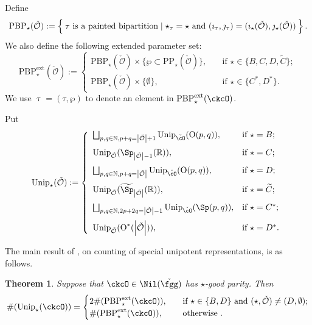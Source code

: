 \documentclass[12pt,a4paper]{amsart}
\def\abs#1{\left|{#1}\right|}
\newcommand{\BN}{{\mathbb {N}}}
\newcommand{\CO}{{\mathcal {O}}}
\newcommand{\oO}{\operatorname{O}}
\newcommand{\R}{\mathbb R}
\numberwithin{equation}{section}
\newtheorem{thm}{Theorem}[section]
\theoremstyle{remark}
\def\Unip{\mathrm{Unip}}
\def\PBPes{\mathrm{PBP}^{\mathrm{ext}}_{\star}}
\begin{document}


Define
\[
\mathrm{PBP}_\star(\check \CO):=\Set{
\tau\textrm{ is a painted bipartition}  \mid  \star_\tau = \star \text{ and } (\imath_\tau,\jmath_\tau) = (\imath_\star(\check \CO), \jmath_\star(\check \CO))
}.
\]
We also define the following extended parameter set:
\[
\PBPes(\check \CO):=\begin{cases}
\mathrm{PBP}_\star(\check \CO)\times \{\wp\subset \mathrm{PP}_\star(\check \CO)\},\quad& \textrm{if }\star\in \{B,C, D, \widetilde C\};\\
\mathrm{PBP}_\star(\check \CO)\times \{\emptyset \},\quad& \textrm{if }\star\in \{C^*, D^*\}.
\end{cases}
\]
We use $\uptau=(\tau,\wp)$ to denote an element in $\PBPes(\ckcO)$.

Put
\[
  \mathrm{Unip}_{\star}(\check \CO):=\left\{
     \begin{array}{ll}
         \bigsqcup_{p,q\in \BN, p+q=\abs{\check \CO}+1} \Unip_{\check \cO}(\oO(p,q)), &\hbox{if $\star=B$}; \medskip\\
           \Unip_{\check \CO}(\Sp_{\abs{\check \CO}-1}(\R)), &\hbox{if $\star=C$}; \medskip\\
           \bigsqcup_{p,q\in \BN, p+q=\abs{\check \CO}} \Unip_{\check \cO}(\oO(p,q)), &\hbox{if $\star=D$}; \medskip\\
          \Unip_{\check \CO}(\widetilde \Sp_{\abs{\check \CO}}(\R)), &\hbox{if $\star=\widetilde{ C}$}; \medskip \\
     \bigsqcup_{p,q\in \BN, 2p+2q=\abs{\check \CO}-1} \Unip_{\check \cO}(\Sp(p,q)), &\hbox{if $\star=C^*$}; \medskip \\
          \Unip_{\check \CO} (\oO^*(\abs{\check \CO})), &\hbox{if $\star=D^*$}.\\
            \end{array}
   \right.
\]

The main result of \cite{BMSZ2}, on counting of special unipotent representations, is as follows.

\begin{thm}\label{thmcount}
Suppose that $\ckcO\in \Nil(\check\fgg)$ has $\star$-good parity. Then
\[
 \#(\Unip_{\star}({\ckcO}))= \begin{cases}
2  \#(\PBPes(\ckcO)),&\quad  \text{if  $\star\in \{B,D\}$ and $(\star, \check \CO)\neq (D, \emptyset)$;}\\
 \#(\PBPes(\ckcO)),  &\quad  \text{otherwise }.\\
\end{cases}
\]
\end{thm}
\end{document}
